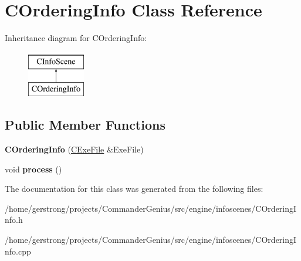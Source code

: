 \hypertarget{class_c_ordering_info}{
\section{COrderingInfo Class Reference}
\label{class_c_ordering_info}
}
Inheritance diagram for COrderingInfo:\begin{figure}[H]
\begin{center}
\leavevmode
\includegraphics[height=2cm]{class_c_ordering_info}
\end{center}
\end{figure}
\subsection*{Public Member Functions}
\begin{DoxyCompactItemize}
\item 
\hypertarget{class_c_ordering_info_a13a3287cca8e381572528448c8168768}{
{\bfseries COrderingInfo} (\hyperlink{class_c_exe_file}{CExeFile} \&ExeFile)}
\label{class_c_ordering_info_a13a3287cca8e381572528448c8168768}

\item 
\hypertarget{class_c_ordering_info_afc5d0156f35c5fd1b89c0b1ea72541f7}{
void {\bfseries process} ()}
\label{class_c_ordering_info_afc5d0156f35c5fd1b89c0b1ea72541f7}

\end{DoxyCompactItemize}


The documentation for this class was generated from the following files:\begin{DoxyCompactItemize}
\item 
/home/gerstrong/projects/CommanderGenius/src/engine/infoscenes/COrderingInfo.h\item 
/home/gerstrong/projects/CommanderGenius/src/engine/infoscenes/COrderingInfo.cpp\end{DoxyCompactItemize}
